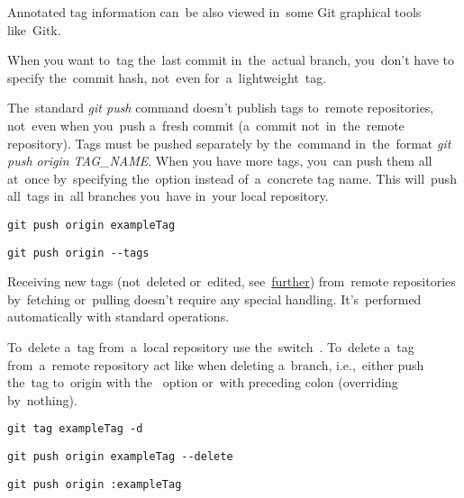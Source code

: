 \noindent Annotated tag information can~be also viewed in~some Git graphical tools like~Gitk.

\note When you want to~tag the~last commit in~the~actual branch, you~don't have to specify the~commit hash, not~even for~a~lightweight~tag.

The~standard \textit{git push} command doesn't publish tags to~remote repositories, not~even when you~push a~fresh commit (a~commit not~in~the~remote repository). Tags must be pushed separately by the~command in~the~format \textit{git push origin TAG\_NAME}. When you have more tags, you~can push them all at~once by~specifying the~option  instead of~a~concrete tag name. This will~push all~tags in~all branches you~have in~your local repository.

\begin{lstlisting}[frame=no]
    git push origin exampleTag
\end{lstlisting}

\begin{lstlisting}[frame=no]
    git push origin --tags
\end{lstlisting}

\note Receiving new tags (not~deleted or~edited, see~\hyperref[gittagsynchronization]{further}) from~remote repositories by~fetching or~pulling doesn't require any special handling. It's~performed automatically with standard operations.

To~delete a~tag from~a~local repository use the~switch~. To~delete a~tag from~a~remote repository act like when deleting a~branch, i.e.,~either push the~tag to~origin with the~ option or~with preceding colon (overriding by~nothing).

\begin{lstlisting}[frame=no]
    git tag exampleTag -d
\end{lstlisting}

\begin{lstlisting}[frame=no]
    git push origin exampleTag --delete
\end{lstlisting}

\begin{lstlisting}[frame=no]
    git push origin :exampleTag
\end{lstlisting}

